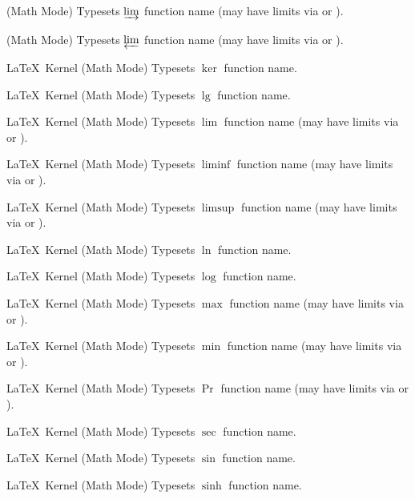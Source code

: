 %
 {}%
 { (Math Mode)}%
 {Typesets \ensuremath{\varinjlim} function name (may have limits via  or ).}%
 {}

%
 {}%
 { (Math Mode)}%
 {Typesets \ensuremath{\varprojlim} function name (may have limits via  or ).}%
 {}

%
 {}%
 {\LaTeX\ Kernel (Math Mode)}%
 {Typesets \ensuremath{\ker} function name.}%
 {}

%
 {}%
 {\LaTeX\ Kernel (Math Mode)}%
 {Typesets \ensuremath{\lg} function name.}%
 {}

%
 {}%
 {\LaTeX\ Kernel (Math Mode)}%
 {Typesets \ensuremath{\lim} function name (may have limits via  or ).}%
 {}

%
 {}%
 {\LaTeX\ Kernel (Math Mode)}%
 {Typesets \ensuremath{\liminf} function name (may have limits via  or ).}%
 {}

%
 {}%
 {\LaTeX\ Kernel (Math Mode)}%
 {Typesets \ensuremath{\limsup} function name (may have limits via  or ).}%
 {}

%
 {}%
 {\LaTeX\ Kernel (Math Mode)}%
 {Typesets \ensuremath{\ln} function name.}%
 {}

%
 {}%
 {\LaTeX\ Kernel (Math Mode)}%
 {Typesets \ensuremath{\log} function name.}%
 {}

%
 {}%
 {\LaTeX\ Kernel (Math Mode)}%
 {Typesets \ensuremath{\max} function name (may have limits via  or ).}%
 {}

%
 {}%
 {\LaTeX\ Kernel (Math Mode)}%
 {Typesets \ensuremath{\min} function name (may have limits via  or ).}%
 {}

%
 {}%
 {\LaTeX\ Kernel (Math Mode)}%
 {Typesets \ensuremath{\Pr} function name (may have limits via  or ).}%
 {}

%
 {}%
 {\LaTeX\ Kernel (Math Mode)}%
 {Typesets \ensuremath{\sec} function name.}%
 {}

%
 {}%
 {\LaTeX\ Kernel (Math Mode)}%
 {Typesets \ensuremath{\sin} function name.}%
 {}

%
 {}%
 {\LaTeX\ Kernel (Math Mode)}%
 {Typesets \ensuremath{\sinh} function name.}%
 {}

